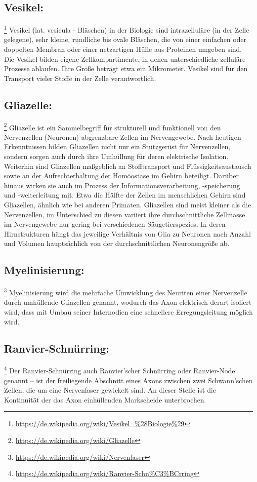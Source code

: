 \subsection{Vesikel:}\footnote{\url{https://de.wikipedia.org/wiki/Vesikel_\%28Biologie\%29}} Vesikel (lat. vesicula - Bläschen) in der Biologie sind intrazelluläre (in der Zelle gelegene), sehr kleine, rundliche bis ovale Bläschen, die von einer einfachen oder doppelten Membran oder einer netzartigen Hülle aus Proteinen umgeben sind. Die Vesikel bilden eigene Zellkompartimente, in denen unterschiedliche zelluläre Prozesse ablaufen. Ihre Größe beträgt etwa ein Mikrometer. Vesikel sind für den Transport vieler Stoffe in der Zelle verantwortlich.

\subsection{Gliazelle:}\footnote{\url{https://de.wikipedia.org/wiki/Gliazelle}} Gliazelle ist ein Sammelbegriff für strukturell und funktionell von den Nervenzellen (Neuronen) abgrenzbare Zellen im Nervengewebe. Nach heutigen Erkenntnissen bilden Gliazellen nicht nur ein Stützgerüst für Nervenzellen, sondern sorgen auch durch ihre Umhüllung für deren elektrische Isolation. Weiterhin sind Gliazellen maßgeblich an Stofftransport und Flüssigkeitsaustausch sowie an der Aufrechterhaltung der Homöostase im Gehirn beteiligt. Darüber hinaus wirken sie auch im Prozess der Informationsverarbeitung, -speicherung und -weiterleitung mit.
Etwa die Hälfte der Zellen im menschlichen Gehirn sind Gliazellen, ähnlich wie bei anderen Primaten. Gliazellen sind meist kleiner als die Nervenzellen, im Unterschied zu diesen variiert ihre durchschnittliche Zellmasse im Nervengewebe nur gering bei verschiedenen Säugetierspezies. In deren Hirnstrukturen hängt das jeweilige Verhältnis von Glia zu Neuronen nach Anzahl und Volumen hauptsächlich von der durchschnittlichen Neuronengröße ab.

\subsection{Myelinisierung:}\footnote{\url{https://de.wikipedia.org/wiki/Nervenfaser}} Myelinisierung wird die mehrfache Umwicklung des Neuriten einer Nervenzelle durch umhüllende Gliazellen genannt, wodurch das Axon elektrisch derart isoliert wird, dass mit Umbau seiner Internodien eine schnellere Erregungsleitung möglich wird.

\subsection{Ranvier-Schnürring:}\footnote{\url{https://de.wikipedia.org/wiki/Ranvier-Schn\%C3\%BCrring}}
Der Ranvier-Schnürring auch Ranvier’scher Schnürring oder Ranvier-Node genannt – ist der freiliegende Abschnitt eines Axons zwischen zwei Schwann’schen Zellen, die um eine Nervenfaser gewickelt sind. An dieser Stelle ist die Kontinuität der das Axon einhüllenden Markscheide unterbrochen.

